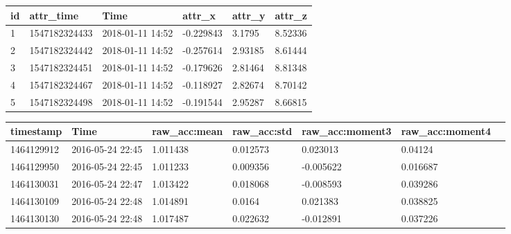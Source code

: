 \documentclass{UoNMCHA}
\numberwithin{equation}{section}
\begin{document}
\begin{table}[]\label{tab:ProjectData}
    \begin{center}
        \begin{tabular}{llllll}
        \hline\hline id & attr\_time & Time & attr\_x   & attr\_y & attr\_z \\ \hline
        1  & 1547182324433 & 2018-01-11 14:52 & -0.229843 & 3.1795  & 8.52336 \\
        2  & 1547182324442 & 2018-01-11 14:52 & -0.257614 & 2.93185 & 8.61444 \\
        3  & 1547182324451 & 2018-01-11 14:52 & -0.179626 & 2.81464 & 8.81348 \\
        4  & 1547182324467 & 2018-01-11 14:52 & -0.118927 & 2.82674 & 8.70142 \\
        5  & 1547182324498 & 2018-01-11 14:52 & -0.191544 & 2.95287 & 8.66815 \\ \hline
        \end{tabular}
    \end{center}
\end{table}


\begin{table}[]\label{tab:ExtraSensoryData}
    \begin{center}
        \begin{tabular}{lllllll}
            \hline\hline timestamp  & Time & raw\_acc:mean & raw\_acc:std & raw\_acc:moment3 & raw\_acc:moment4 \\\hline 
        1464129912 & 2016-05-24 22:45 & 1.011438                       & 0.012573                      & 0.023013                          & 0.04124      \\
        1464129950 & 2016-05-24 22:45 & 1.011233                       & 0.009356                      & -0.005622                         & 0.016687     \\
        1464130031 & 2016-05-24 22:47 & 1.013422                       & 0.018068                      & -0.008593                         & 0.039286     \\
        1464130109 & 2016-05-24 22:48 & 1.014891                       & 0.0164                        & 0.021383                          & 0.038825     \\
        1464130130 & 2016-05-24 22:48 & 1.017487                       & 0.022632                      & -0.012891                         & 0.037226    \\\hline 
        \end{tabular}
    \end{center}
\end{table}
\end{document}
